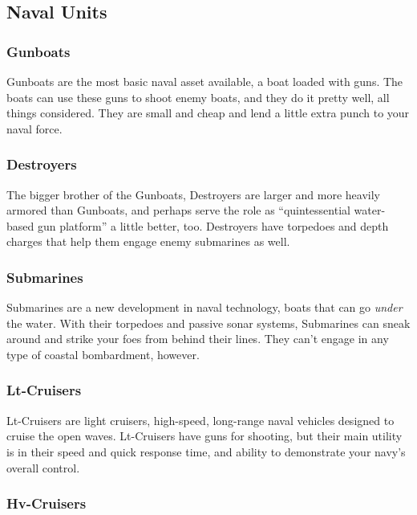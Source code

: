 \documentclass[11 pt]{scrartcl}
\begin{document}
\subsection*{Naval Units}

\subsubsection*{Gunboats}

Gunboats are the most basic naval asset available, a boat loaded with guns. The boats can use these guns to shoot enemy boats, and they do it pretty well, all things considered. They are small and cheap and lend a little extra punch to your naval force.

\subsubsection*{Destroyers}

The bigger brother of the Gunboats, Destroyers are larger and more heavily armored than Gunboats, and perhaps serve the role as ``quintessential water-based gun platform'' a little better, too. Destroyers have torpedoes and depth charges that help them engage enemy submarines as well.

\subsubsection*{Submarines}

Submarines are a new development in naval technology, boats that can go \textit{under} the water. With their torpedoes and passive sonar systems, Submarines can sneak around and strike your foes from behind their lines. They can't engage in any type of coastal bombardment, however.

\subsubsection*{Lt-Cruisers}

Lt-Cruisers are light cruisers, high-speed, long-range naval vehicles designed to cruise the open waves. Lt-Cruisers have guns for shooting, but their main utility is in their speed and quick response time, and ability to demonstrate your navy's overall control.

\subsubsection*{Hv-Cruisers}
\end{document}
